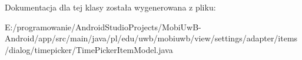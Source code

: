 Dokumentacja dla tej klasy została wygenerowana z pliku\+:\begin{DoxyCompactItemize}
\item 
E\+:/programowanie/\+Android\+Studio\+Projects/\+Mobi\+Uw\+B-\/\+Android/app/src/main/java/pl/edu/uwb/mobiuwb/view/settings/adapter/items/dialog/timepicker/Time\+Picker\+Item\+Model.\+java\end{DoxyCompactItemize}
